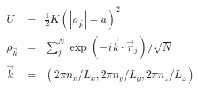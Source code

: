 \documentclass[12pt]{article}
\begin{document}
\begin{eqnarray*}
 U &=&  \frac{1}{2} K (|\rho_{\vec{k}}| - a)^2 \\
 \rho_{\vec{k}} &=& \sum_j^N \exp(-i\vec{k} \cdot \vec{r}_j )/\sqrt{N} \\
 \vec{k} &=& (2\pi n_x /L_x , 2\pi n_y  /L_y , 2\pi n_z/L_z ) 
\end{eqnarray*}
\end{document}
